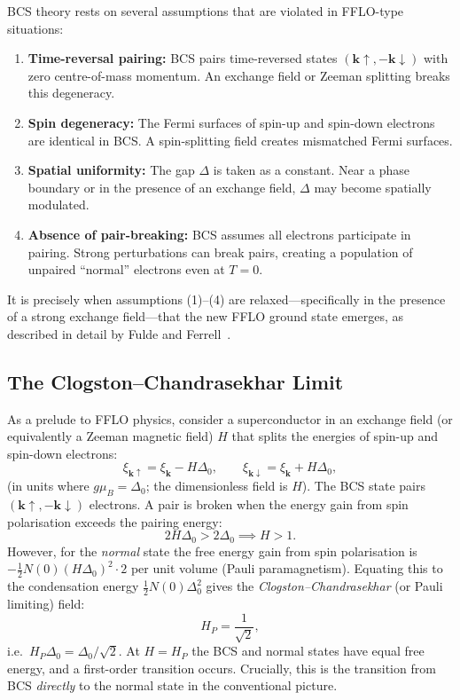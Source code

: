 BCS theory rests on several assumptions that are violated in FFLO-type
situations:
\begin{enumerate}
	\item \textbf{Time-reversal pairing:} BCS pairs time-reversed states
	$(\mathbf{k}\uparrow, -\mathbf{k}\downarrow)$ with zero centre-of-mass
	momentum. An exchange field or Zeeman splitting breaks this degeneracy.
	\item \textbf{Spin degeneracy:} The Fermi surfaces of spin-up and spin-down
	electrons are identical in BCS. A spin-splitting field creates mismatched
	Fermi surfaces.
	\item \textbf{Spatial uniformity:} The gap $\Delta$ is taken as a constant.
	Near a phase boundary or in the presence of an exchange field, $\Delta$
	may become spatially modulated.
	\item \textbf{Absence of pair-breaking:} BCS assumes all electrons participate
	in pairing. Strong perturbations can break pairs, creating a population of
	unpaired ``normal'' electrons even at $T=0$.
\end{enumerate}
It is precisely when assumptions (1)--(4) are relaxed---specifically in the
presence of a strong exchange field---that the new FFLO ground state emerges,
as described in detail by Fulde and Ferrell~\cite{FF1964}.

\subsection{The Clogston--Chandrasekhar Limit}

As a prelude to FFLO physics, consider a superconductor in an exchange field
(or equivalently a Zeeman magnetic field) $H$ that splits the energies of
spin-up and spin-down electrons:
\begin{equation}
	\xi_{\mathbf{k}\uparrow} = \xi_{\mathbf{k}} - H\Delta_0, \qquad
	\xi_{\mathbf{k}\downarrow} = \xi_{\mathbf{k}} + H\Delta_0,
\end{equation}
(in units where $g\mu_B = \Delta_0$; the dimensionless field is $H$).
The BCS state pairs $(\mathbf{k}\uparrow, -\mathbf{k}\downarrow)$ electrons.
A pair is broken when the energy gain from spin polarisation exceeds the
pairing energy:
\begin{equation}
	2H\Delta_0 > 2\Delta_0 \implies H > 1.
\end{equation}
However, for the \emph{normal} state the free energy gain from spin
polarisation is $-\frac{1}{2}N(0)(H\Delta_0)^2 \cdot 2$ per unit volume
(Pauli paramagnetism). Equating this to the condensation energy
$\frac{1}{2}N(0)\Delta_0^2$ gives the \emph{Clogston--Chandrasekhar}
(or Pauli limiting) field:
\begin{equation}
	\boxed{H_P = \frac{1}{\sqrt{2}},}
	\label{eq:Clogston}
\end{equation}
i.e.\ $H_P \Delta_0 = \Delta_0/\sqrt{2}$.
At $H = H_P$ the BCS and normal states have equal free energy, and a first-order
transition occurs. Crucially, this is the transition from BCS \emph{directly}
to the normal state in the conventional picture.

